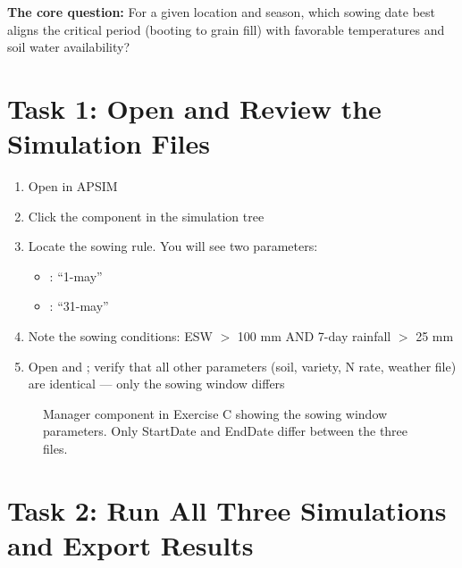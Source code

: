 \begin{keyconceptbox}
\textbf{The core question:} For a given location and season, which sowing date best aligns the critical period (booting to grain fill) with favorable temperatures and soil water availability?
\end{keyconceptbox}

\section{Task 1: Open and Review the Simulation Files}

\begin{enumerate}
  \item Open  in APSIM
  \item Click the  component in the simulation tree
  \item Locate the sowing rule. You will see two parameters:
    \begin{itemize}
      \item {}: ``1-may''
      \item {}: ``31-may''
    \end{itemize}
  \item Note the sowing conditions: ESW $>$ 100 mm AND 7-day rainfall $>$ 25 mm
  \item Open  and ; verify that all other parameters (soil, variety, N rate, weather file) are identical --- only the sowing window differs
\end{enumerate}

\begin{figure}[H]
  \centering
  \caption{Manager component in Exercise C showing the sowing window parameters. Only StartDate and EndDate differ between the three files.}
  \label{fig:exercise-c-manager}
\end{figure}

\section{Task 2: Run All Three Simulations and Export Results}

